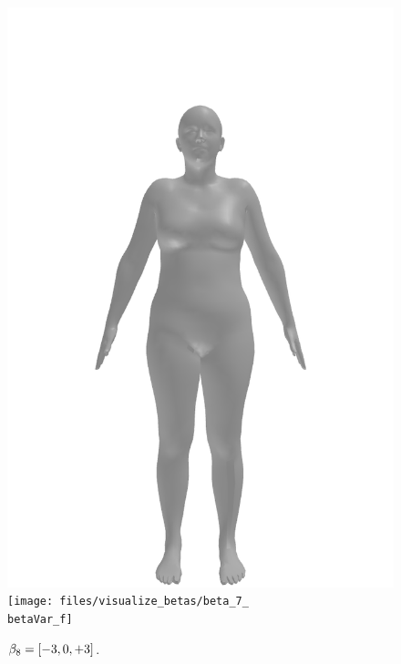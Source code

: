 \begin{figure}[ht!]
\begin{minipage}[b]{\textwidth}
        \includegraphics[width=\imgWidth]{files/visualize_betas/baseline_f}
        \texttt{[image: files/visualize\_betas/beta\_7\_\\betaVar\_f]}
        \caption[Effect of varying $\beta_8$ in SMPL.]{$\beta_8 = [-3, 0, +3]$.}
    \end{minipage}
\end{figure}

